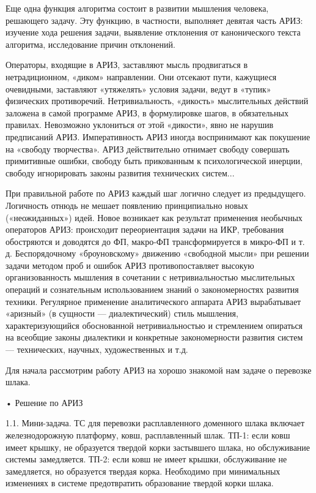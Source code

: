 Еще  одна  функция алгоритма  состоит  в  развитии мышления  человека,
решающего  задачу.   Эту  функцию,  в  частности,   выполняет  девятая
часть  АРИЗ: изучение  хода  решения задачи,  выявление отклонения  от
канонического текста алгоритма, исследование причин отклонений.

Операторы,   входящие  в   АРИЗ,  заставляют   мысль  продвигаться   в
нетрадиционном,  «диком»  направлении.  Они отсекают  пути,  кажущиеся
очевидными,  заставляют «утяжелять»  условия задачи,  ведут в  «тупик»
физических   противоречий.  Нетривиальность,   «дикость»  мыслительных
действий  заложена в  самой программе  АРИЗ, в  формулировке шагов,  в
обязательных правилах.  Невозможно уклониться от этой  «дикости», явно
не нарушив  предписаний АРИЗ. Императивность АРИЗ  иногда воспринимают
как  покушение на  «свободу творчества».  АРИЗ действительно  отнимает
свободу  совершать   примитивные  ошибки,  свободу   быть  прикованным
к  психологической  инерции,   свободу  игнорировать  законы  развития
технических систем...

При  правильной  работе   по  АРИЗ  каждый  шаг   логично  следует  из
предыдущего.  Логичность  отнюдь  не  мешает  появлению  принципиально
новых («неожиданных»)  идей. Новое возникает как  результат применения
необычных операторов  АРИЗ: происходит  переориентация задачи  на ИКР,
требования обостряются и доводятся  до ФП, макро-ФП трансформируется в
микро-ФП  и т.  д. Беспорядочному  «броуновскому» движению  «свободной
мысли» при решении задачи методом проб и ошибок АРИЗ противопоставляет
высокую  организованность  мышления  в  сочетании  с  нетривиальностью
мыслительных   операций  и   сознательным   использованием  знаний   о
закономерностях развития техники. Регулярное применение аналитического
аппарата  АРИЗ вырабатывает  «аризный» (в  сущности —  диалектический)
стиль  мышления,  характеризующийся  обоснованной  нетривиальностью  и
стремлением  опираться  на  всеобщие законы  диалектики  и  конкретные
закономерности развития систем  — технических, научных, художественных
и т.д.


Для  начала рассмотрим  работу АРИЗ  на хорошо  знакомой нам  задаче о
перевозке шлака.

• Решение по АРИЗ

1.1.  Мини-задача. ТС  для  перевозки  расплавленного доменного  шлака
включает  железнодорожную платформу,  ковш, расплавленный  шлак. ТП-1:
если ковш имеет крышку, не  образуется твердой корки застывшего шлака,
но обслуживание системы замедляется. ТП-2:  если ковш не имеет крышки,
обслуживание не  замедляется, но образуется твердая  корка. Необходимо
при минимальных изменениях в системе предотвратить образование твердой
корки шлака.

